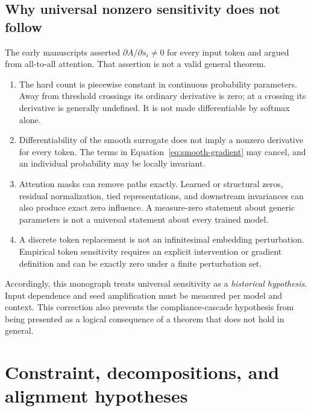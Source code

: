 \subsection{Why universal nonzero sensitivity does not follow}
The early manuscripts asserted $\partial A/\partial s_i\neq0$ for every input token and argued from all-to-all attention. That assertion is not a valid general theorem.
\begin{enumerate}
  \item The hard count is piecewise constant in continuous probability parameters. Away from threshold crossings its ordinary derivative is zero; at a crossing its derivative is generally undefined. It is not made differentiable by softmax alone.
  \item Differentiability of the smooth surrogate does not imply a nonzero derivative for every token. The terms in Equation~\eqref{eq:smooth-gradient} may cancel, and an individual probability may be locally invariant.
  \item Attention masks can remove paths exactly. Learned or structural zeros, residual normalization, tied representations, and downstream invariances can also produce exact zero influence. A measure-zero statement about generic parameters is not a universal statement about every trained model.
  \item A discrete token replacement is not an infinitesimal embedding perturbation. Empirical token sensitivity requires an explicit intervention or gradient definition and can be exactly zero under a finite perturbation set.
\end{enumerate}
Accordingly, this monograph treats universal sensitivity as a \emph{historical hypothesis}. Input dependence and seed amplification must be measured per model and context. This correction also prevents the compliance-cascade hypothesis from being presented as a logical consequence of a theorem that does not hold in general.

\section{Constraint, decompositions, and alignment hypotheses}
